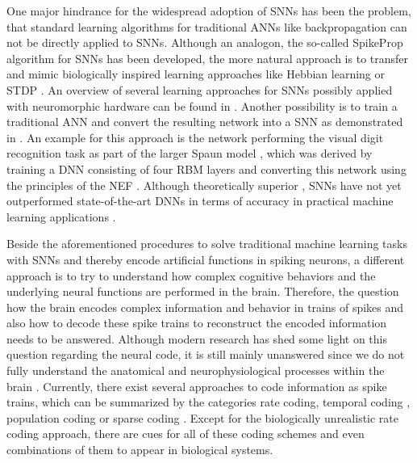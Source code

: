 One major hindrance for the widespread adoption of \acp{SNN} has been the problem, that standard learning algorithms for traditional \acp{ANN} like backpropagation \parencite{Werbos1974} can not be directly applied to \acp{SNN}.
Although an analogon, the so-called SpikeProp algorithm \parencite{Bohte2002} for \acp{SNN} has been developed, the more natural approach is to transfer and mimic biologically inspired learning approaches like Hebbian learning \parencite{Hebb1949} or \ac{STDP} \parencite{Bi2001}.
An overview of several learning approaches for \acp{SNN} possibly applied with neuromorphic hardware can be found in \textcite{Walter2015}.
Another possibility is to train a traditional \ac{ANN} and convert the resulting network into a \ac{SNN} as demonstrated in \textcites{Diehl2015, Hunsberger2015}.
An example for this approach is the network performing the visual digit recognition task as part of the larger \ac{Spaun} model \parencite{Eliasmith2012}, which was derived by training a \ac{DNN} consisting of four \ac{RBM} layers and converting this network using the principles of the \ac{NEF} \parencite{Eliasmith2003}.
Although theoretically superior \parencite{Maass1997}, \acp{SNN} have not yet outperformed state-of-the-art \acp{DNN} in terms of accuracy in practical machine learning applications \parencite{Schmidhuber2015}.

Beside the aforementioned procedures to solve traditional machine learning tasks with \acp{SNN} and thereby encode artificial functions in spiking neurons, a different approach is to try to understand how complex cognitive behaviors and the underlying neural functions are performed in the brain.
Therefore, the question how the brain encodes complex information and behavior in trains of spikes and also how to decode these spike trains to reconstruct the encoded information needs to be answered.
Although modern research has shed some light on this question regarding the neural code, it is still mainly unanswered since we do not fully understand the anatomical and neurophysiological processes within the brain \parencite{Stanley2013}.
Currently, there exist several approaches to code information as spike trains, which can be summarized by the categories rate coding, temporal coding \parencite[Chap. 7.6]{Gerstner2014}, population coding \parencites[Chap. 1]{Gerstner2002}{Ponulak2011}{Boerlin2011} or sparse coding \parencite{Olshausen1996}.
Except for the biologically unrealistic rate coding approach, there are cues for all of these coding schemes and even combinations \parencite{Gupta2014} of them to appear in biological systems.

